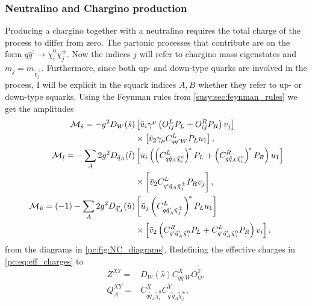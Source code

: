 \documentclass[../main.tex]{subfiles}
\begin{document}
\subsubsection*{Neutralino and Chargino production}
Producing a chargino together with a neutralino requires the total charge of the process to differ from zero.
The partonic processes that contribute are on the form \(q \bar{q}^\prime \to \tilde\chi^0_i \tilde\chi^\pm_j\).
Now the indices \(j\) will refer to chargino mass eigenstates and \(m_j = m_{\tilde\chi^\pm_j}\).
Furthermore, since both up- and down-type quarks are involved in the process, I will be explicit in the squark indices \(A, B\) whether they refer to up- or down-type squarks.
Using the Feynman rules from \cref{susy:sec:feynman_rules} we get the amplitudes
\begin{subequations}
  \begin{align}
    \nonumber
    \M_{\hat{s}} = -g^2 D_W(\hat{s})                                & \bclosed{ \bar{u}_i\gamma^\mu\pclosed{O^{L}_{ij}P_L + O^{R}_{ij}P_R} v_j }
    \\
    \label{pc:eq:NC_Ms}
                                                                    & \times \bclosed{ \bar{v}_2 \gamma_\mu C^L_{qq^\prime W}P_L u_1 },
    \\
    \nonumber
    \M_{\hat{t}} = -\sum_A 2g^2 D_{\tilde{q}_A}(\hat{t})            & \bclosed{ \bar{u}_i \pclosed{\pclosed{C_{q \tilde{q}_A \nino[i]}^L}^{\!\ast} P_L + \pclosed{C_{q \tilde{q}_A \nino[i]}^R}^{\!\ast} P_R} u_1 }
    \\
    \label{pc:eq:NC_Mt}
                                                                    & \times \bclosed{ \bar{v}_2 C_{q^\prime \tilde{q}_A \tilde\chi^\pm_j}^L P_R v_j },
    \\
    \nonumber
    \M_{\hat{u}} = (-1)-\sum_A 2g^2 D_{\tilde{q}_A^\prime}(\hat{u}) & \bclosed{ \bar{u}_j \pclosed{C_{q \tilde{q}_A^\prime \tilde\chi^\pm_j}^L}^{\!\ast} P_L u_1 }
    \\
    \label{pc:eq:NC_Mu}
                                                                    & \times \bclosed{ \bar{v}_2 \pclosed{C_{q^\prime \tilde{q}_A^\prime \nino[i]}^R P_L + C_{q^\prime \tilde{q}_A^\prime \nino[i]}^L P_R} v_i },
  \end{align}
\end{subequations}
from the diagrams in \cref{pc:fig:NC_diagrams}.
Redefining the effective charges in \cref{pc:eq:eff_charges} to
\begin{subequations}
  \begin{align*}
    Z^{XY} =     & D_W(\hat{s}) C_{qq^\prime W}^X O_{ij}^Y,                                        \\
    Q_{A}^{XY} = & C_{q \tilde{q}_A \tilde\chi^0_i}^X C_{q^\prime \tilde{q}_A \tilde\chi^\pm_j}^Y,
  \end{align*}
\end{subequations}
\end{document}
